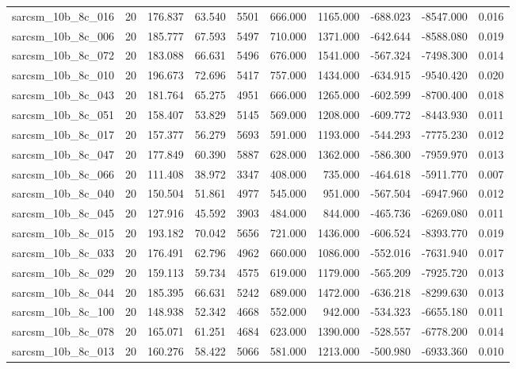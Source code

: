 \begin{tabular}{lrrrrrrrrr}
sarcsm\_10b\_8c\_016 & 20 & 176.837 & 63.540 & 5501 & 666.000 & 1165.000 & -688.023 & -8547.000 & 0.016 \\
sarcsm\_10b\_8c\_006 & 20 & 185.777 & 67.593 & 5497 & 710.000 & 1371.000 & -642.644 & -8588.080 & 0.019 \\
sarcsm\_10b\_8c\_072 & 20 & 183.088 & 66.631 & 5496 & 676.000 & 1541.000 & -567.324 & -7498.300 & 0.014 \\
sarcsm\_10b\_8c\_010 & 20 & 196.673 & 72.696 & 5417 & 757.000 & 1434.000 & -634.915 & -9540.420 & 0.020 \\
sarcsm\_10b\_8c\_043 & 20 & 181.764 & 65.275 & 4951 & 666.000 & 1265.000 & -602.599 & -8700.400 & 0.018 \\
sarcsm\_10b\_8c\_051 & 20 & 158.407 & 53.829 & 5145 & 569.000 & 1208.000 & -609.772 & -8443.930 & 0.011 \\
sarcsm\_10b\_8c\_017 & 20 & 157.377 & 56.279 & 5693 & 591.000 & 1193.000 & -544.293 & -7775.230 & 0.012 \\
sarcsm\_10b\_8c\_047 & 20 & 177.849 & 60.390 & 5887 & 628.000 & 1362.000 & -586.300 & -7959.970 & 0.013 \\
sarcsm\_10b\_8c\_066 & 20 & 111.408 & 38.972 & 3347 & 408.000 & 735.000 & -464.618 & -5911.770 & 0.007 \\
sarcsm\_10b\_8c\_040 & 20 & 150.504 & 51.861 & 4977 & 545.000 & 951.000 & -567.504 & -6947.960 & 0.012 \\
sarcsm\_10b\_8c\_045 & 20 & 127.916 & 45.592 & 3903 & 484.000 & 844.000 & -465.736 & -6269.080 & 0.011 \\
sarcsm\_10b\_8c\_015 & 20 & 193.182 & 70.042 & 5656 & 721.000 & 1436.000 & -606.524 & -8393.770 & 0.019 \\
sarcsm\_10b\_8c\_033 & 20 & 176.491 & 62.796 & 4962 & 660.000 & 1086.000 & -552.016 & -7631.940 & 0.017 \\
sarcsm\_10b\_8c\_029 & 20 & 159.113 & 59.734 & 4575 & 619.000 & 1179.000 & -565.209 & -7925.720 & 0.013 \\
sarcsm\_10b\_8c\_044 & 20 & 185.395 & 66.631 & 5242 & 689.000 & 1472.000 & -636.218 & -8299.630 & 0.013 \\
sarcsm\_10b\_8c\_100 & 20 & 148.938 & 52.342 & 4668 & 552.000 & 942.000 & -534.323 & -6655.180 & 0.011 \\
sarcsm\_10b\_8c\_078 & 20 & 165.071 & 61.251 & 4684 & 623.000 & 1390.000 & -528.557 & -6778.200 & 0.014 \\
sarcsm\_10b\_8c\_013 & 20 & 160.276 & 58.422 & 5066 & 581.000 & 1213.000 & -500.980 & -6933.360 & 0.010 \\

\end{tabular}
